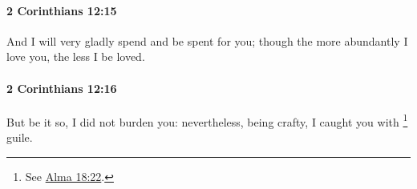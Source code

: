 		\paragraph{2 Corinthians 12:15} %
			\label{2CORINTHIANS-12-15}

			And I will very gladly spend and be spent for you; though the more abundantly I love you, the less I be loved.

			\begin{framed}
			\scriptsize
				\begin{compactdesc}
					\item[SBLG] 
				\end{compactdesc}
			\end{framed}

		\paragraph{2 Corinthians 12:16} %
			\label{2CORINTHIANS-12-16}

			But be it so, I did not burden you: nevertheless, being crafty, I caught you with
				\footnote{%
					See \hyperref[ALMA-18-22]{Alma 18:22}.
					}%
			guile.

